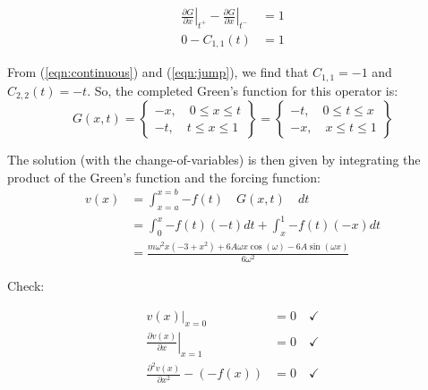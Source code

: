 \documentclass[10pt]{article}
\begin{document}
\begin{equation}
    \label{eqn:jump}
    \begin{split}
        \left. \frac{\partial G}{\partial x} \right| _{t^+} - \left. \frac{\partial G}{\partial x} \right| _{t^-} &= 1 \\
        0 - C_{1,1}(t) &= 1
    \end{split}
\end{equation}

From (\ref{eqn:continuous}) and (\ref{eqn:jump}), we find that $C_{1,1}=-1$ and $C_{2,2}(t)=-t$. So, the completed Green's function for this operator is:
\begin{equation}
    \label{eqn:green}
    G(x,t) = 
    \left\{ \begin{matrix}
        -x, \quad 0 \le x \le t \\ 
        -t, \quad t \le x \le 1
    \end{matrix} \right\}
    =
    \left\{ \begin{matrix}
        -t, \quad 0 \le t \le x \\ 
        -x, \quad x \le t \le 1
    \end{matrix} \right\} 
\end{equation}

The solution (with the change-of-variables) is then given by integrating the product of the Green's function and the forcing function:
\begin{equation}
    \label{eqn:v(x)}
    \begin{split}
        v(x) &= \int_{x=a}^{x=b}{-f(t) \quad G(x,t) \quad dt} \\
        &= \int_{0}^{x}{-f(t)(-t)dt} + \int_{x}^{1}{-f(t)(-x)dt} \\
        &= \frac{m \omega^2 x (-3 + x^2) + 6 A \omega x \cos(\omega) - 
        6 A \sin(\omega x)}{6 \omega^2}
    \end{split}
\end{equation}

Check:
    
\begin{equation}
    \begin{split}
        \left. v(x) \right|_{x=0} &= 0 \quad \checkmark \\
        \left. \frac{\partial v(x)}{\partial x} \right|_{x=1} &= 0 \quad \checkmark \\
        \frac{\partial^2 v(x)}{\partial x^2} - (-f(x)) &= 0 \quad \checkmark
    \end{split}
\end{equation}
\end{document}
